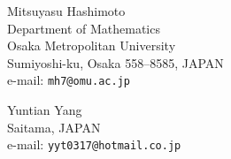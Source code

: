 \documentclass[11pt,leqno]{article}
\theoremstyle{definition}
\theoremstyle{remark}
\theoremstyle{remark}
\begin{document}
\begin{flushleft}
Mitsuyasu Hashimoto\\
Department of Mathematics\\
Osaka Metropolitan University\\
Sumiyoshi-ku, Osaka 558--8585, JAPAN\\
e-mail: {\tt mh7@omu.ac.jp}
\end{flushleft}

\begin{flushleft}
  Yuntian Yang\\
  Saitama, JAPAN\\
e-mail: {\tt yyt0317@hotmail.co.jp}
\end{flushleft}
\end{document}
